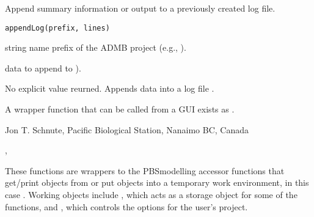 \documentclass[letterpaper]{book}
\begin{document}
%
\begin{SeeAlso}\relax
\end{SeeAlso}
%
\begin{Description}\relax
Append summary information or output to a previously created log file.
\end{Description}
%
\begin{Usage}
\begin{verbatim}
appendLog(prefix, lines)
\end{verbatim}
\end{Usage}
%
\begin{Arguments}
\begin{ldescription}
\item[\code{prefix}] string name prefix of the ADMB project (e.g., ).
\item[\code{lines}] data to append to ).
\end{ldescription}
\end{Arguments}
%
\begin{Value}
No explicit value reurned. Appends data into a log file 
.
\end{Value}
%
\begin{Note}\relax
A wrapper function that can be called from a GUI exists as .
\end{Note}
%
\begin{Author}\relax
 Jon T. Schnute, Pacific Biological Station, Nanaimo BC, Canada 
\end{Author}
%
\begin{SeeAlso}\relax
 ,  
\end{SeeAlso}
%
\begin{Description}\relax
These functions are wrappers to the PBSmodelling accessor functions that
get/print objects from or put objects into a temporary work environment,
in this case . Working objects include ,
which acts as a storage object for some of the functions, and ,
which controls the options for the user's project.
\end{Description}
\end{document}
